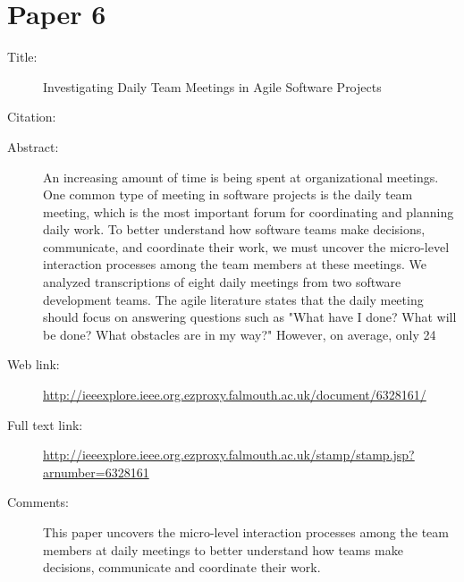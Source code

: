 \documentclass{scrartcl}
\begin{document}
\section*{Paper 6}
\begin{description}
\item[Title:] Investigating Daily Team Meetings in Agile Software Projects
\item[Citation:] \cite{bibtex_key}
\item[Abstract:] An increasing amount of time is being spent at organizational meetings. One common type of meeting in software projects is the daily team meeting, which is the most important forum for coordinating and planning daily work. To better understand how software teams make decisions, communicate, and coordinate their work, we must uncover the micro-level interaction processes among the team members at these meetings. We analyzed transcriptions of eight daily meetings from two software development teams. The agile literature states that the daily meeting should focus on answering questions such as "What have I done? What will be done? What obstacles are in my way?" However, on average, only 24%
\item[Web link:] \url{http://ieeexplore.ieee.org.ezproxy.falmouth.ac.uk/document/6328161/}
\item[Full text link:] \url{http://ieeexplore.ieee.org.ezproxy.falmouth.ac.uk/stamp/stamp.jsp?arnumber=6328161}
\item[Comments:] This paper uncovers the micro-level interaction processes among the team members at daily meetings to better understand how teams make decisions, communicate and coordinate their work.
\end{description}



\end{document}
